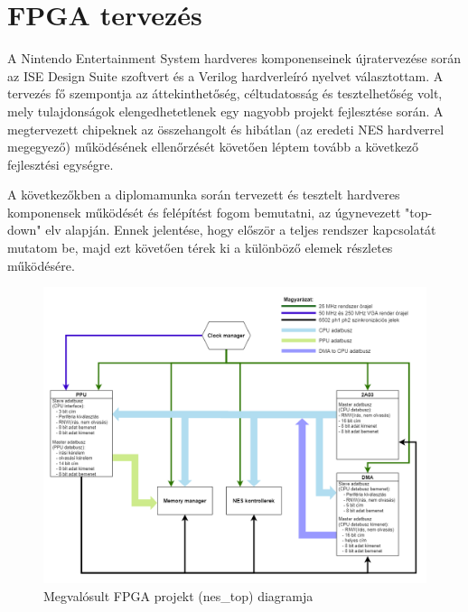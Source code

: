 \chapter{FPGA tervezés}
\label{sec:fpga-desing-begining}

A Nintendo Entertainment System hardveres komponenseinek újratervezése során az ISE Design Suite szoftvert és a Verilog hardverleíró nyelvet választottam. A tervezés fő szempontja az áttekinthetőség, %
céltudatosság és tesztelhetőség volt, mely tulajdonságok elengedhetetlenek egy nagyobb projekt fejlesztése során. A megtervezett chipeknek az összehangolt és hibátlan (az eredeti NES hardverrel megegyező) működésének ellenőrzését követően léptem tovább a következő fejlesztési egységre.

A következőkben a diplomamunka során tervezett és tesztelt hardveres komponensek működését és felépítést fogom bemutatni, az úgynevezett "top-down" elv alapján. Ennek jelentése, hogy először a teljes rendszer kapcsolatát mutatom be, majd ezt követően térek ki a különböző elemek részletes működésére.

\begin{figure}[H]
	\centering
	\includegraphics[width=150mm, keepaspectratio]{figures/FPGA-toplevel-diagram}
	\caption{Megvalósult FPGA projekt (nes\_top) diagramja} 
	\label{fig:FPGA-toplevel-diagram}
\end{figure}

